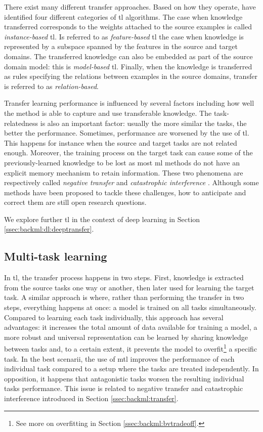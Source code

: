 There exist many different transfer approaches. Based on how they operate,
\cite{yang2020transfer} have identified four different categories of \acrlong{tl}
algorithms. The case when knowledge transferred corresponds to the weights attached
to the source examples is called \textit{instance-based} \acrlong{tl}. Is referred
to as \textit{feature-based} \acrlong{tl} the case when knowledge is represented
by a subspace spanned by the features in the source and target domains. The
transferred knowledge can also be embedded as part of the source domain model:
this is \textit{model-based} \acrlong{tl}. Finally, when the knowledge is transferred
as rules specifying the relations between examples in the source domains, transfer
is referred to as \textit{relation-based}.

Transfer learning performance is influenced by several factors including how well
the method is able to capture and use transferable knowledge. The task-relatedness
is also an important factor: usually the more similar the tasks, the better the
performance. Sometimes, performance are worsened by the use of \acrlong{tl}. This
happens for instance when the source and target tasks are not related enough.
Moreover, the training process on the target task can cause some of the
previously-learned knowledge to be lost as most \acrlong{ml} methods do not have
an explicit memory mechanism to retain information. These two phenomena are
respectively called \textit{negative transfer} \cite{zhang2020overcoming}
and \textit{catastrophic interference} \cite{french1999catastrophic}. Although
some methods have been proposed to tackle these challenges, how to anticipate and
correct them are still open research questions.

We explore further \acrlong{tl} in the context of deep learning in Section
\ref{ssec:backml:dl:deeptransfer}.

\subsection{Multi-task learning}
\label{ssec:backml:mtl}

In \acrlong{tl}, the transfer process happens in two steps. First, knowledge is
extracted from the source tasks one way or another, then later used for learning
the target task. A similar approach is  where, rather than performing
the transfer in two steps, everything happens at once: a model is trained on all
tasks simultaneously. Compared to learning each task individually, this approach
has several advantages: it increases the total amount of data available for training
a model, a more robust and universal representation can be learned by sharing
knowledge between tasks and, to a certain extent, it prevents the model to
overfit\footnote{See more on overfitting in Section \ref{ssec:backml:bvtradeoff}.}
a specific task. In the best scenarii, the use of \acrlong{mtl} improves the
performance of each individual task compared to a setup where the tasks are treated
independently. In opposition, it happens that antagonistic tasks worsen the
resulting individual tasks performance. This issue is related to negative transfer
and catastrophic interference introduced in Section \ref{ssec:backml:transfer}.

